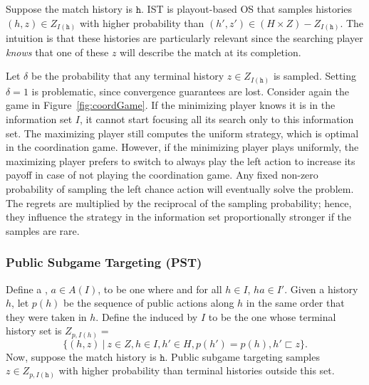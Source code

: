\documentclass[letterpaper]{article}
\newcommand{\tth}{\mathtt{h}}
\newcommand{\defword}[1]{\textbf{\boldmath{#1}}}
\newcounter{vlNoteCounter}
\newcommand{\vlnote}[1]{{\scriptsize \color{blue} $\blacksquare$ \refstepcounter{vlNoteCounter}\textsf{[VL]$_{\arabic{vlNoteCounter}}$:{#1}}}}
\begin{document}
Suppose the match history is $\tth$. IST is playout-based OS that samples histories $(h,z) \in Z_{I(\tth)}$ 
with higher probability than $(h',z') \in (H \times Z) - Z_{I(\tth)}$. The intuition is that these histories are particularly 
relevant since the searching player {\it knows} that one of these $z$ will describe the match at its completion. 

Let $\delta$ be 
the probability that any terminal history $z \in Z_{I(\tth)}$ is sampled.
Setting $\delta = 1$ is problematic, since convergence guarantees are lost.
Consider again the game in Figure~\ref{fig:coordGame}. 
If the minimizing player knows it is in the information set $I$, it cannot start focusing all its 
search only to this information set. The maximizing player still computes the uniform strategy, which is optimal in the coordination game. 
However, if the minimizing player plays uniformly, the maximizing player prefers to switch to always play the left action to increase its payoff in case of not playing the coordination game. Any fixed non-zero probability of sampling the left chance action will 
eventually solve the problem. The regrets are multiplied by the reciprocal of the sampling probability; hence, they influence the strategy 
in the information set proportionally stronger if the samples are rare. 


\subsubsection{Public Subgame Targeting (PST)}

Define a \defword{public action}, $a \in A(I)$, to be one where and for all $h \in I$, $ha \in I'$.
Given a history $h$, let $p(h)$ be the sequence of public actions along $h$ in the same order that they were taken in $h$. 
Define the \defword{public subgame} induced by $I$ to be the one whose terminal history set is $Z_{p,I(h)} =$ 
\[\{(h,z)~|~z \in Z, h \in I, h' \in H, p(h') = p(h), h' \sqsubset z \}.\]
Now, suppose the match history is $\tth$.
Public subgame targeting samples $z \in Z_{p,I(\tth)}$ with higher probability than terminal histories outside this set.
\end{document}
